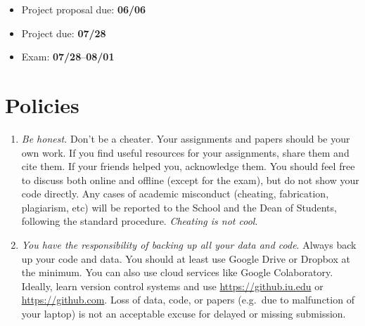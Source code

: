 \documentclass[11pt,article,oneside]{memoir} %
\begin{document}
\begin{itemize}
\item Project proposal due: \textbf{06/06}
\item Project due: \textbf{07/28}
\item Exam: \textbf{07/28}--\textbf{08/01}
\end{itemize} 



%

\section{Policies}%
\begin{enumerate}%
    \setlength\itemsep{1em}


\item \emph{Be honest.} Don't be a cheater. Your assignments and papers should be your own work.  
If you find useful resources for your assignments, share them and cite them. 
If your friends helped you, acknowledge them. 
You should feel free to discuss both online and offline (except for the exam), but do not show your code directly.  
Any cases of academic misconduct (cheating, fabrication, plagiarism, etc) will be reported to the School and the Dean of Students, following the standard procedure. 
\emph{Cheating is not cool}. 


\item \emph{You have the responsibility of backing up all your data and code}.
Always back up your code and data. You should at least use Google Drive or Dropbox at the minimum.
You can also use cloud services like Google Colaboratory.
Ideally, learn version control systems and use \url{https://github.iu.edu} or \url{https://github.com}. 
Loss of data, code, or papers (e.g.~due to malfunction of your laptop) is not an acceptable excuse for delayed or missing submission. 


\end{enumerate}
\end{document}
